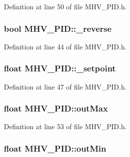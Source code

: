 \-Definition at line 50 of file \-M\-H\-V\-\_\-\-P\-I\-D.\-h.

\hypertarget{class_m_h_v___p_i_d_ae47baf90291256480ae57cbbc1ed917c}{
\subsubsection[{\-\_\-reverse}]{\setlength{\rightskip}{0pt plus 5cm}bool {\bf \-M\-H\-V\-\_\-\-P\-I\-D\-::\-\_\-reverse}}}
\label{class_m_h_v___p_i_d_ae47baf90291256480ae57cbbc1ed917c}


\-Definition at line 44 of file \-M\-H\-V\-\_\-\-P\-I\-D.\-h.

\hypertarget{class_m_h_v___p_i_d_a46322bf586cac91fef5c2e38f269c718}{
\subsubsection[{\-\_\-setpoint}]{\setlength{\rightskip}{0pt plus 5cm}float {\bf \-M\-H\-V\-\_\-\-P\-I\-D\-::\-\_\-setpoint}}}
\label{class_m_h_v___p_i_d_a46322bf586cac91fef5c2e38f269c718}


\-Definition at line 47 of file \-M\-H\-V\-\_\-\-P\-I\-D.\-h.

\hypertarget{class_m_h_v___p_i_d_a0a31a7a38d1257dd94ce8cb875bad616}{
\subsubsection[{out\-Max}]{\setlength{\rightskip}{0pt plus 5cm}float {\bf \-M\-H\-V\-\_\-\-P\-I\-D\-::out\-Max}}}
\label{class_m_h_v___p_i_d_a0a31a7a38d1257dd94ce8cb875bad616}


\-Definition at line 53 of file \-M\-H\-V\-\_\-\-P\-I\-D.\-h.

\hypertarget{class_m_h_v___p_i_d_a4298ba8305fd0e43abd95481801e6487}{
\subsubsection[{out\-Min}]{\setlength{\rightskip}{0pt plus 5cm}float {\bf \-M\-H\-V\-\_\-\-P\-I\-D\-::out\-Min}}}
\label{class_m_h_v___p_i_d_a4298ba8305fd0e43abd95481801e6487}


